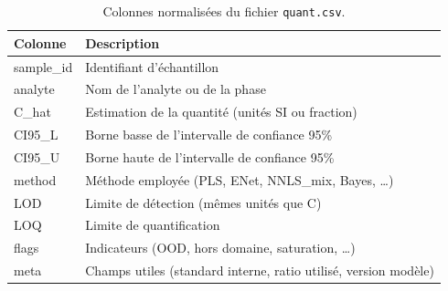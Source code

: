 
\begin{table}[h]
\centering
\caption{Colonnes normalisées du fichier \texttt{quant.csv}.}
\begin{tabular}{ll}
\toprule
\textbf{Colonne} & \textbf{Description} \\
\midrule
sample\_id & Identifiant d'échantillon \\
analyte & Nom de l'analyte ou de la phase \\
C\_hat & Estimation de la quantité (unités SI ou fraction) \\
CI95\_L & Borne basse de l'intervalle de confiance 95\% \\
CI95\_U & Borne haute de l'intervalle de confiance 95\% \\
method & Méthode employée (PLS, ENet, NNLS\_mix, Bayes, \ldots) \\
LOD & Limite de détection (mêmes unités que C) \\
LOQ & Limite de quantification \\
flags & Indicateurs (OOD, hors domaine, saturation, \ldots) \\
meta & Champs utiles (standard interne, ratio utilisé, version modèle) \\
\bottomrule
\end{tabular}
\end{table}
